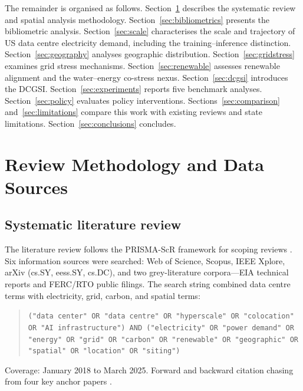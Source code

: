 \documentclass[preprint,12pt]{elsarticle}
\begin{document}
The remainder is organised as follows. Section~\ref{sec:methodology}
describes the systematic review and spatial analysis methodology.
Section~\ref{sec:bibliometrics} presents the bibliometric analysis.
Section~\ref{sec:scale} characterises the scale and trajectory of US data
centre electricity demand, including the training--inference distinction.
Section~\ref{sec:geography} analyses geographic distribution.
Section~\ref{sec:gridstress} examines grid stress mechanisms.
Section~\ref{sec:renewable} assesses renewable alignment and the
water--energy co-stress nexus. Section~\ref{sec:dcgsi} introduces the
DCGSI. Section~\ref{sec:experiments} reports five benchmark analyses.
Section~\ref{sec:policy} evaluates policy interventions.
Sections~\ref{sec:comparison} and~\ref{sec:limitations} compare this work
with existing reviews and state limitations. Section~\ref{sec:conclusions}
concludes.

\section{Review Methodology and Data Sources}
\label{sec:methodology}

\subsection{Systematic literature review}
\label{subsec:litreview}

The literature review follows the PRISMA-ScR framework for scoping reviews
\cite{tricco2018prisma_scr}. Six information sources were searched: Web of
Science, Scopus, IEEE Xplore, arXiv (cs.SY, eess.SY, cs.DC), and two
grey-literature corpora---EIA technical reports and FERC/RTO public filings.
The search string combined data centre terms with electricity, grid, carbon,
and spatial terms:

\begin{quote}\small\sloppy
\noindent\texttt{("data center" OR "data centre" OR "hyperscale" OR "colocation"
OR "AI infrastructure") AND ("electricity" OR "power demand" OR "energy" OR
"grid" OR "carbon" OR "renewable" OR "geographic" OR "spatial" OR
"location" OR "siting")}
\end{quote}

Coverage: January 2018 to March 2025. Forward and backward citation chasing
from four key anchor papers \cite{masanet2020recalibrating, shehabi2024lbnl,
strubell2019energy, iea2024electricity}.
\end{document}

